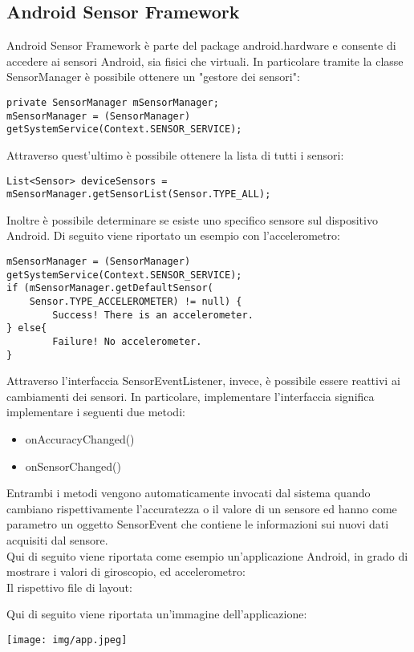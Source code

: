 \documentclass{article}
\begin{document}
\subsection{Android Sensor Framework}
Android Sensor Framework è parte del package android.hardware e consente di accedere ai sensori Android, sia fisici che virtuali. 
In particolare tramite la classe SensorManager è possibile ottenere un "gestore dei sensori":
\begin{lstlisting}
private SensorManager mSensorManager;
mSensorManager = (SensorManager) getSystemService(Context.SENSOR_SERVICE);
\end{lstlisting}
Attraverso quest'ultimo è possibile ottenere la lista di tutti i sensori:
\begin{lstlisting}
List<Sensor> deviceSensors = mSensorManager.getSensorList(Sensor.TYPE_ALL);
\end{lstlisting}
Inoltre è possibile determinare se esiste uno specifico sensore sul dispositivo Android. Di seguito viene riportato un esempio con l'accelerometro:
\begin{lstlisting}
mSensorManager = (SensorManager) getSystemService(Context.SENSOR_SERVICE); 
if (mSensorManager.getDefaultSensor(
    Sensor.TYPE_ACCELEROMETER) != null) {
        Success! There is an accelerometer.
} else{
        Failure! No accelerometer.
}
\end{lstlisting}
Attraverso l'interfaccia SensorEventListener, invece, è possibile essere reattivi ai cambiamenti dei sensori.
In particolare, implementare l'interfaccia significa implementare i seguenti due metodi:
\begin{itemize}
    \item onAccuracyChanged()
    \item onSensorChanged()
\end{itemize}
Entrambi i metodi vengono automaticamente invocati dal sistema quando cambiano rispettivamente l'accuratezza o il valore di un sensore ed hanno come parametro un oggetto SensorEvent che contiene le informazioni sui nuovi dati acquisiti dal sensore.\\
Qui di seguito viene riportata come esempio un'applicazione Android, in grado di mostrare i valori di giroscopio, ed accelerometro:\\

Il rispettivo file di layout:

Qui di seguito viene riportata un'immagine dell'applicazione:
\begin{center}
\texttt{[image: img/app.jpeg]}    
\end{center}
\end{document}
